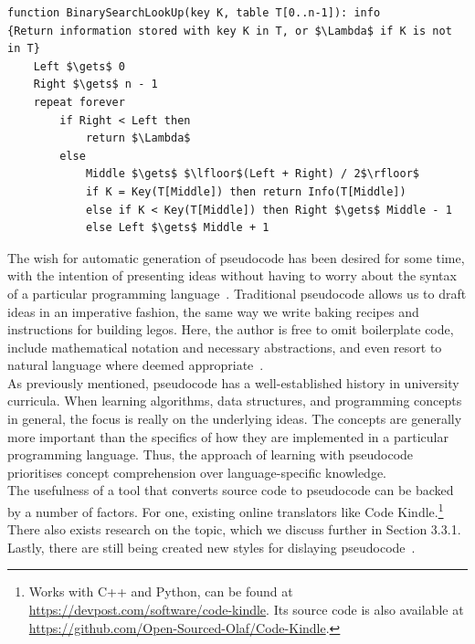 \begin{lstlisting}[basicstyle=\footnotesize\ttfamily, caption={Binary Search by Lewis et al.}, captionpos=b, label={Binary Search by Lewis et al.}]
function BinarySearchLookUp(key K, table T[0..n-1]): info
{Return information stored with key K in T, or $\Lambda$ if K is not in T}
    Left $\gets$ 0
    Right $\gets$ n - 1
    repeat forever
        if Right < Left then
            return $\Lambda$
        else
            Middle $\gets$ $\lfloor$(Left + Right) / 2$\rfloor$
            if K = Key(T[Middle]) then return Info(T[Middle])
            else if K < Key(T[Middle]) then Right $\gets$ Middle - 1
            else Left $\gets$ Middle + 1
\end{lstlisting}

The wish for automatic generation of pseudocode has been desired for some time, with the intention of presenting ideas without having to worry about the syntax of a particular programming language~\cite{desireToGetPseudocodeGeneration}. Traditional pseudocode allows us to draft ideas in an imperative fashion, the same way we write baking recipes and instructions for building legos. Here, the author is free to omit boilerplate code, include mathematical notation and necessary abstractions, and even resort to natural language where deemed appropriate~\cite{pseudocodeInBook1, freedomOfPseudocode}. \\

As previously mentioned, pseudocode has a well-established history in university curricula. When learning algorithms, data structures, and programming concepts in general, the focus is really on the underlying ideas. The concepts are generally more important than the specifics of how they are implemented in a particular programming language. Thus, the approach of learning with pseudocode prioritises concept comprehension over language-specific knowledge. \\

The usefulness of a tool that converts source code to pseudocode can be backed by a number of factors. For one, existing online translators like Code Kindle.\footnote{Works with C++ and Python, can be found at \url{https://devpost.com/software/code-kindle}. Its source code is also available at \url{https://github.com/Open-Sourced-Olaf/Code-Kindle}.} There also exists research on the topic, which we discuss further in Section 3.3.1. Lastly, there are still being created new styles for dislaying pseudocode~\cite{displayingPseudocode}.


